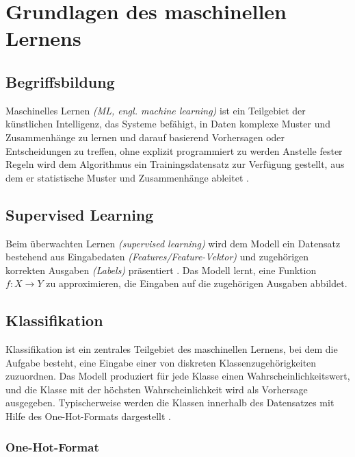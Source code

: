 \section{Grundlagen des maschinellen Lernens}\label{sec:ml-grundlagen}
\subsection{Begriffsbildung}\label{sub:ml-begriffsbildung}

Maschinelles Lernen \textit{(ML, engl. machine learning)} ist ein Teilgebiet der künstlichen Intelligenz, das Systeme befähigt, in Daten komplexe Muster und Zusammenhänge zu lernen und darauf basierend Vorhersagen oder Entscheidungen zu treffen, ohne explizit programmiert zu werden Anstelle fester Regeln wird dem Algorithmus ein Trainingsdatensatz zur Verfügung gestellt, aus dem er statistische Muster und Zusammenhänge ableitet \cite[Kap. ~1.4]{MachineLearning1st}.

\subsection{Supervised Learning}\label{sub:supervised-learning}

Beim überwachten Lernen  \textit{(supervised learning)} wird dem Modell ein Datensatz bestehend aus Eingabedaten \textit{(Features/Feature-Vektor)} und zugehörigen korrekten Ausgaben \textit{(Labels)} präsentiert \cite[S. ~9]{hastieElementsStatisticalLearning2009} \cite[Kap. ~1.5]{MachineLearning1st}. Das Modell lernt, eine Funktion $f: X \rightarrow Y$ zu approximieren, die Eingaben auf die zugehörigen Ausgaben abbildet.

\subsection{Klassifikation}\label{sub:klassifikation}

Klassifikation ist ein zentrales Teilgebiet des maschinellen Lernens, bei dem die Aufgabe besteht, eine Eingabe einer von diskreten Klassenzugehörigkeiten zuzuordnen. Das Modell produziert für jede Klasse einen Wahrscheinlichkeitswert, und die Klasse mit der höchsten Wahrscheinlichkeit wird als Vorhersage ausgegeben. Typischerweise werden die Klassen innerhalb des Datensatzes mit Hilfe des One-Hot-Formats dargestellt \cite[Kap. ~2.7]{hastieElementsStatisticalLearning2009}.

\subsubsection{One-Hot-Format}\label{ssub:one-hot-format}

